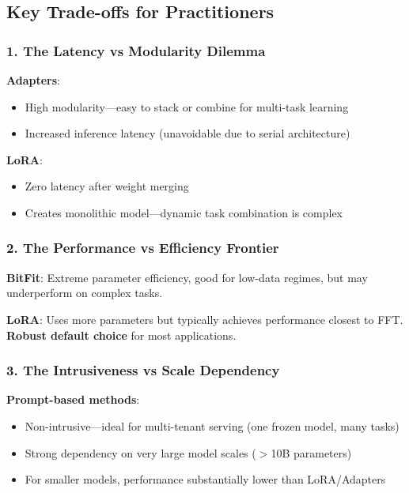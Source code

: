 \documentclass{article}
\begin{document}
\subsection{Key Trade-offs for Practitioners}

\subsubsection{1. The Latency vs Modularity Dilemma}

\textbf{Adapters}:
\begin{itemize}
\item[$+$] High modularity---easy to stack or combine for multi-task learning
\item[$-$] Increased inference latency (unavoidable due to serial architecture)
\end{itemize}

\textbf{LoRA}:
\begin{itemize}
\item[$+$] Zero latency after weight merging
\item[$-$] Creates monolithic model---dynamic task combination is complex
\end{itemize}

\subsubsection{2. The Performance vs Efficiency Frontier}

\textbf{BitFit}: Extreme parameter efficiency, good for low-data regimes, but may underperform on complex tasks.

\textbf{LoRA}: Uses more parameters but typically achieves performance closest to FFT. \textbf{Robust default choice} for most applications.

\subsubsection{3. The Intrusiveness vs Scale Dependency}

\textbf{Prompt-based methods}:
\begin{itemize}
\item[$+$] Non-intrusive---ideal for multi-tenant serving (one frozen model, many tasks)
\item[$-$] Strong dependency on very large model scales ($>$10B parameters)
\item[$-$] For smaller models, performance substantially lower than LoRA/Adapters
\end{itemize}
\end{document}
